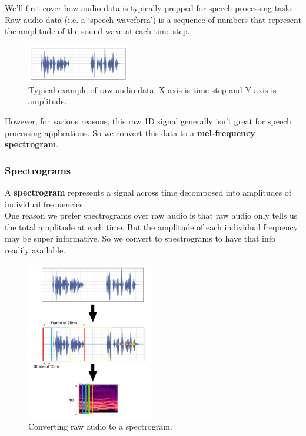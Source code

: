 \documentclass{article}
\begin{document}
We'll first cover how audio data is typically prepped for speech processing tasks. \\

Raw audio data (i.e. a `speech waveform') is a sequence of numbers that represent the amplitude of the sound wave at each time step. \\

\begin{figure}[h]
\centering
\includegraphics[width=0.4\textwidth]{images/raw_audio.png}
\caption{Typical example of raw audio data. X axis is time step and Y axis is amplitude.}
\end{figure}

However, for various reasons, this raw 1D signal generally isn't great for speech processing applications. So we convert this data to a \textbf{mel-frequency spectrogram}.

\newpage

\subsubsection{Spectrograms}
A \textbf{spectrogram} represents a signal across time decomposed into amplitudes of individual frequencies. \\

One reason we prefer spectrograms over raw audio is that raw audio only tells us the total amplitude at each time. But the amplitude of each individual frequency may be super informative. So we convert to spectrograms to have that info readily available. \\

\begin{figure}[h]
    \centering
    \includegraphics[width=0.5\textwidth]{images/spectrogram_conversion.png}
    \caption{Converting raw audio to a spectrogram.}
\end{figure}
\end{document}
